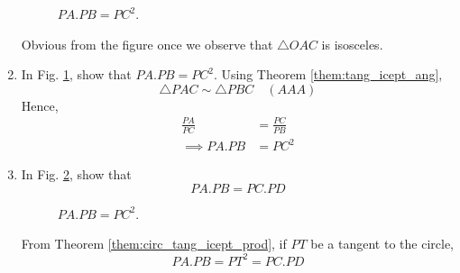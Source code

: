 \begin{enumerate}[label=\arabic*.,ref=\thesubsection.\theenumi]
	\begin{figure}[!ht]
		\begin{center}
			
			\resizebox{\columnwidth}{!}{}
		\end{center}
		\caption{$PA.PB = PC^2$.}
		\label{fig:circ_tang_icept}	
	\end{figure}

%
\solution Obvious from the figure once we observe that $\triangle OAC$ is isosceles.
%
%
\item
	In Fig. \ref{fig:circ_tang_icept}, show that $PA.PB = PC^2$.
\label{them:circ_tang_icept_prod}	
\solution Using Theorem \ref{them:tang_icept_ang},
\begin{equation}
\triangle PAC \sim \triangle PBC \quad (AAA)
\end{equation}
 Hence,
%
\begin{align}
\frac{PA}{PC} &= \frac{PC}{PB} \\
\implies PA.PB &=PC^2
\end{align}
%
%
%
\item
	In Fig. \ref{fig:chord_tang_prod}, show that
\begin{equation}
	PA.PB = PC.PD
	\end{equation}

%
\begin{figure}[!ht]
	\begin{center}
		
		\resizebox{\columnwidth}{!}{}
	\end{center}
	\caption{$PA.PB = PC^2$.}
	\label{fig:chord_tang_prod}	
\end{figure}

\solution From Theorem \ref{them:circ_tang_icept_prod}, if $PT$ be a tangent to the circle, 	
\begin{equation}
	PA.PB = PT^2 =PC.PD
	\end{equation}
\end{enumerate}
